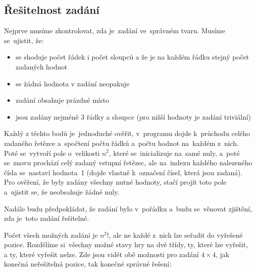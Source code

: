 \documentclass[12pt,titlepage]{article}
\begin{document}
\subsection{Řešitelnost zadání}
Nejprve musíme zkontrolovat, zda je~zadání ve~správném tvaru. Musíme se~ujistit, že:
\begin{itemize}
\item se shoduje počet řádek i počet sloupců a že je na každém řádku stejný počet zadaných hodnot
\item se žádná hodnota v zadání neopakuje
\item zadání obsahuje prázdné místo
\item jsou zadány nejméně 3 řádky a sloupce (pro nižší hodnoty je zadání triviální)
\end{itemize}

Každý z těchto bodů je~jednoduché ověřit, v~programu dojde k~průchodu celého zadaného řetězce a~spočtení počtu řádků a~počtu hodnot na~každém z~nich. Poté se~vytvoří pole o~velikosti $n^2$, které se~inicializuje na~samé nuly, a~poté se~znovu prochází celý zadaný vstupní řetězec, ale na~indexu každého nalezeného čísla se~nastaví hodnota~1 (dojde vlastně k~označení čísel, která jsou zadaná). Pro ověření, že byly zadány všechny nutné hodnoty, stačí projít toto pole a~ujistit se, že neobsahuje žádné nuly. 
\par
Nadále budu předpokládat, že zadání bylo v~pořádku a~budu se~věnovat zjištění, zda je~toto zadání řešitelné.
\newline
\par
Počet všech možných zadání je $n^2!$, ale ne každé z~nich lze seřadit do vyřešené pozice. Rozdělíme si~všechny možné stavy hry na dvě třídy, ty, které lze vyřešit, a ty, které vyřešit nelze. Zde jsou vidět obě možnosti pro zadání $4\times4$, jak konečná neřešitelná pozice, tak konečné správné řešení:
\newline
\end{document}
